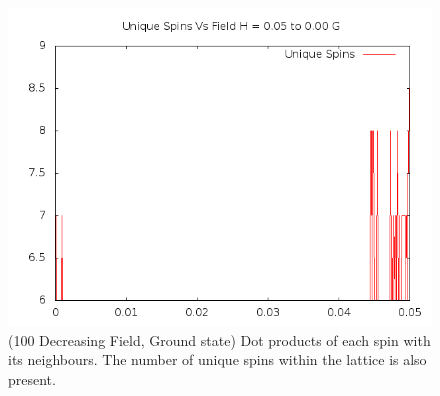 \documentclass{article}
\begin{document}
\begin{figure}[ht]
\centering
\includegraphics[scale=0.5]{100/005to000Freq.png}
\caption{(100 Decreasing Field, Ground state) Dot products of each spin with its neighbours. The number of unique spins within the lattice is also present.}
\end{figure}
\clearpage
\end{document}
